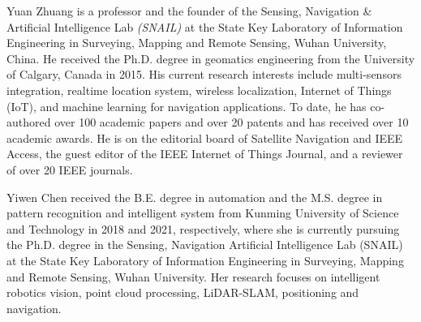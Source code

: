 \documentclass[lettersize,journal]{IEEEtran}
\begin{document}
\begin{IEEEbiography}{Yuan Zhuang}
is a professor and the founder of the Sensing, Navigation \& Artificial Intelligence Lab \emph{(SNAIL)} at the State Key Laboratory of Information Engineering in Surveying, Mapping and Remote Sensing, Wuhan University, China. He received the Ph.D. degree in geomatics engineering from the University of Calgary, Canada in 2015. His current research interests include multi-sensors integration, realtime location system, wireless localization, Internet of Things (IoT), and machine learning for navigation applications. To date, he has co-authored over 100 academic papers and over 20 patents and has received over 10 academic awards. He is on the editorial board of Satellite Navigation and IEEE Access, the guest editor of the IEEE Internet of Things Journal, and a reviewer of over 20 IEEE journals.
\end{IEEEbiography}

\begin{IEEEbiography}{Yiwen Chen}
received  the B.E. degree in automation and the M.S. degree in pattern recognition and intelligent system from Kunming University of Science and Technology in 2018 and 2021, respectively, where she is currently pursuing the Ph.D. degree in the Sensing, Navigation Artificial Intelligence Lab (SNAIL) at the State Key Laboratory of Information Engineering in Surveying, Mapping and Remote Sensing, Wuhan University. Her research focuses on intelligent robotics vision, point cloud processing, LiDAR-SLAM, positioning and navigation.
\end{IEEEbiography}
\end{document}

